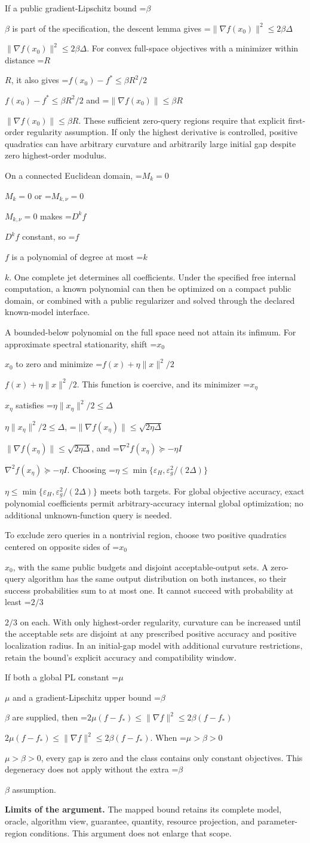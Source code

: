 \documentclass[10pt,a4paper]{article}
\newcommand{\AtlasMath}[1]{\par\begingroup\centering\setbox0=\hbox{$\displaystyle #1$}\ifdim\wd0>1.4\linewidth\typeout{ATLAS WIDE FORMULA: \the\wd0}\fi\ifdim\wd0>\linewidth\resizebox{\linewidth}{!}{\box0}\else\box0\fi\par\endgroup}
\newcommand{\AtlasInlineMath}[1]{\begingroup\setbox0=\hbox{$#1$}\ifdim\wd0>.4\linewidth\endgroup\AtlasMath{#1}\else\endgroup$#1$\fi}
\begin{document}
If a public gradient-Lipschitz bound \AtlasInlineMath{\beta} is part of the specification, the descent lemma gives \AtlasInlineMath{\|\nabla f(x_0)\|^2\le2\beta\Delta}. For convex full-space objectives with a minimizer within distance \AtlasInlineMath{R}, it also gives \AtlasInlineMath{f(x_0)-f^*\le\beta R^2/2} and \AtlasInlineMath{\|\nabla f(x_0)\|\le\beta R}. These sufficient zero-query regions require that explicit first-order regularity assumption. If only the highest derivative is controlled, positive quadratics can have arbitrary curvature and arbitrarily large initial gap despite zero highest-order modulus.

On a connected Euclidean domain, \AtlasInlineMath{M_k=0} or \AtlasInlineMath{M_{k,\nu}=0} makes \AtlasInlineMath{D^kf} constant, so \AtlasInlineMath{f} is a polynomial of degree at most \AtlasInlineMath{k}. One complete jet determines all coefficients. Under the specified free internal computation, a known polynomial can then be optimized on a compact public domain, or combined with a public regularizer and solved through the declared known-model interface.

A bounded-below polynomial on the full space need not attain its infimum. For approximate spectral stationarity, shift \AtlasInlineMath{x_0} to zero and minimize \AtlasInlineMath{f(x)+\eta\|x\|^2/2}. This function is coercive, and its minimizer \AtlasInlineMath{x_\eta} satisfies \AtlasInlineMath{\eta\|x_\eta\|^2/2\le\Delta}, \AtlasInlineMath{\|\nabla f(x_\eta)\|\le\sqrt{2\eta\Delta}}, and \AtlasInlineMath{\nabla^2f(x_\eta)\succeq-\eta I}. Choosing \AtlasInlineMath{\eta\le\min\{\varepsilon_H,\varepsilon_g^2/(2\Delta)\}} meets both targets. For global objective accuracy, exact polynomial coefficients permit arbitrary-accuracy internal global optimization; no additional unknown-function query is needed.

To exclude zero queries in a nontrivial region, choose two positive quadratics centered on opposite sides of \AtlasInlineMath{x_0}, with the same public budgets and disjoint acceptable-output sets. A zero-query algorithm has the same output distribution on both instances, so their success probabilities sum to at most one. It cannot succeed with probability at least \AtlasInlineMath{2/3} on each. With only highest-order regularity, curvature can be increased until the acceptable sets are disjoint at any prescribed positive accuracy and positive localization radius. In an initial-gap model with additional curvature restrictions, retain the bound's explicit accuracy and compatibility window.

If both a global PL constant \AtlasInlineMath{\mu} and a gradient-Lipschitz upper bound \AtlasInlineMath{\beta} are supplied, then \AtlasInlineMath{2\mu(f-f_*)\le\|\nabla f\|^2\le2\beta(f-f_*)}. When \AtlasInlineMath{\mu>\beta>0}, every gap is zero and the class contains only constant objectives. This degeneracy does not apply without the extra \AtlasInlineMath{\beta} assumption.

\textbf{Limits of the argument.} The mapped bound retains its complete model, oracle, algorithm view, guarantee, quantity, resource projection, and parameter-region conditions. This argument does not enlarge that scope.
\end{document}
